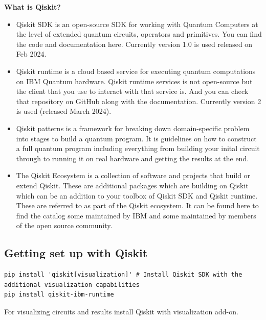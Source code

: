 \documentclass[12pt, oneside]{book}
\theoremstyle{definition}
\theoremstyle{definition}
\theoremstyle{remark}
\begin{document}
\textbf{What is Qiskit?}\\
\begin{itemize}
\item Qiskit SDK is an open-source SDK for working with Quantum Computers at the level of extended quantum circuits, operators and primitives. You can find the code and documentation here. Currently version 1.0 is used released on Feb 2024.

\item Qiskit runtime is a cloud based service for executing quantum computations on IBM Quantum hardware. Qiskit runtime services is not open-source but the client that you use to interact with that service is. And you can check that repository on GitHub along with the documentation. Currently version 2 is used (released March 2024).

\item Qiskit patterns is a framework for breaking down domain-specific problem into stages to build a quantum program. It is guidelines on how to construct a full quantum program including everything from building your inital circuit through to running it on real hardware and getting the results at the end.

\item The Qiskit Ecosystem is a collection of software and projects that build or extend Qiskit. These are additional packages which are building on Qiskit which can be an addition to your toolbox of Qiskit SDK and Qiskit runtime. These are referred to as part of the Qiskit ecosystem. It can be found here to find the catalog some maintained by IBM and some maintained by members of the open source community.
\end{itemize}

\subsection{Getting set up with Qiskit}
\begin{lstlisting}
pip install 'qiskit[visualization]' # Install Qiskit SDK with the additional visualization capabilities
pip install qiskit-ibm-runtime
\end{lstlisting}

For visualizing circuits and results install Qiskit with visualization add-on.



\backmatter  %
    
    
\end{document}
